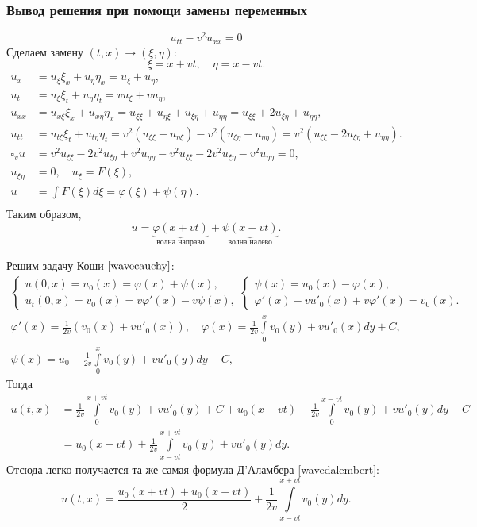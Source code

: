 \subsubsection{Вывод решения при помощи замены переменных}
$$u_{tt} - v^2 u_{xx} = 0$$
Сделаем замену $(t, x) \to (\xi, \eta)$:
$$ \xi = x + vt, \quad \eta = x - vt.$$
\begin{align*}
	u_x &= u_{\xi} \xi_x + u_{\eta} \eta_x = u_{\xi} + u_{\eta}, \\
	u_t &=  u_{\xi} \xi_t + u_{\eta} \eta_t = v u_{\xi} + v u_{\eta}, \\
	u_{xx} &= u_{x\xi} \xi_x + u_{x\eta} \eta_x = u_{\xi\xi} + u_{\eta\xi} + u_{\xi\eta} + u_{\eta\eta}  =  u_{\xi\xi} + 2 u_{\xi\eta} + u_{\eta\eta}, \\
	u_{tt} &= u_{t\xi} \xi_t + u_{t\eta} \eta_t = v^2 (u_{\xi\xi} - u_{\eta\xi}) - v^2 (u_{\xi\eta} - u_{\eta\eta}) = v^2 (u_{\xi\xi} - 2u_{\xi\eta} + u_{\eta\eta}). \\
	\square_v u &= v^2 u_{\xi\xi} - 2v^2 u_{\xi\eta} + v^2 u_{\eta\eta} - v^2 u_{\xi\xi} - 2v^2 u_{\xi\eta} - v^2 u_{\eta\eta} = 0, \\
	u_{\xi\eta} &= 0, \quad u_{\xi} = F(\xi), \\
	u &= \int F(\xi) d\xi = \varphi (\xi) + \psi (\eta). \\
\end{align*}
Таким образом,
$$ u = \underbrace {\varphi (x+vt)}_{\text{волна направо}} + \underbrace {\psi (x-vt)}_{\text{волна налево}}.$$

Решим задачу Коши $\eqref{wavecauchy}$:
\begin{gather*}
	\begin{cases}
		u(0,x) = u_0(x) = \varphi(x) + \psi(x), \\
		u_t(0,x) = v_0(x) = v \varphi'(x) - v \psi(x),
	\end{cases}
	\begin{cases}
		\psi(x) = u_0(x) - \varphi(x), \\
		\varphi'(x)  - vu'_0(x) + v \varphi'(x) = v_0(x).
	\end{cases} \\
	\varphi'(x) = \frac {1} {2v} (v_0(x) + vu'_0(x)), \quad 	\varphi(x) = \frac {1} {2v} \int \limits_0^x v_0(y) + vu'_0(x) dy + C, \\
	\psi(x) = u_0 - \frac {1} {2v} \int \limits_0^x v_0(y) + vu'_0(y) dy - C,
\end{gather*}
Тогда
\begin{align*}
	u(t,x) &= \frac {1} {2v} \int \limits_0^{x+vt} v_0(y) + vu'_0(y) + C + u_0(x-vt) -  \frac {1} {2v} \int \limits_0^{x-vt} v_0(y) + vu'_0(y) dy - C \\
		&= u_0(x-vt) + \frac {1} {2v} \int \limits_{x-vt}^{x+vt} v_0(y) + v u'_0(y) dy.
\end{align*}
Отсюда легко получается та же самая формула Д'Аламбера \eqref{wavedalembert}:
\begin{equation*}
	u(t,x) = \frac {u_0(x+vt) + u_0(x-vt)} {2} + \frac {1} {2v} \int \limits_{x-vt}^{x+vt} v_0(y)dy.
\end{equation*}

